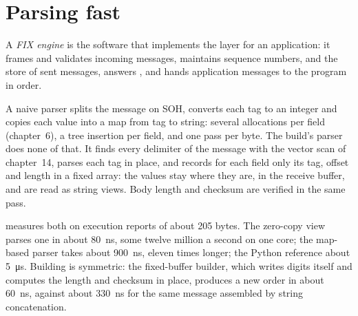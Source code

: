 \section{Parsing fast}

\begin{definition}\label{def:ll:protocols-i-fix:engine}
A \emph{FIX engine} is the software that implements the  layer for an application: it frames
and validates incoming messages, maintains sequence numbers,  and the store of sent messages, answers , and hands application messages to the program in order.
\end{definition}

A naive parser splits the message on SOH, converts each tag to an integer and copies each value into a map from tag to
string: several allocations per field (chapter~6), a tree insertion per field, and one pass per byte. The build's parser does
none of that. It finds every delimiter of the message with the vector scan of chapter~14, parses each tag in place, and
records for each field only its tag, offset and length in a fixed array: the values stay where they are, in the receive
buffer, and are read as string views. Body length and checksum are verified in the same pass.

\label{lst:ll:protocols-i-fix:parse}

 measures both on execution reports of about 205 bytes. The zero-copy view parses one in
about \qty{80}{\nano\second}, some twelve million a second on one core; the map-based parser takes about
\qty{900}{\nano\second}, eleven times longer; the Python reference about \qty{5}{\micro\second}. Building is symmetric: the
fixed-buffer builder, which writes digits itself and computes the length and checksum in place, produces a new order in about
\qty{60}{\nano\second}, against about \qty{330}{\nano\second} for the same message assembled by string concatenation.

